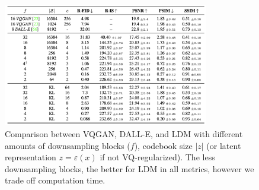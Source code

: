 \begin{figure}[h]
    \centering
    \includegraphics[width=0.8\textwidth]{images/diffusion_models/stable_diffusion/table_8.png}
    \caption{Comparison between VQGAN, DALL-E, and LDM with different amounts of downsampling blocks ($f$), codebook size $|z|$ (or latent representation $z = \varepsilon (x)$ if not VQ-regularized). The less downsampling blocks, the better for LDM in all metrics, however we trade off computation time.}
\end{figure}
